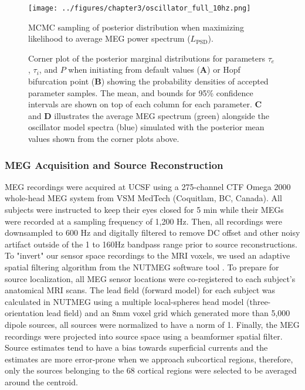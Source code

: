 \begin{figure}[ht]
    \centering
    \captionsetup{justification=centerlast}
    \texttt{[image: ../figures/chapter3/oscillator\_full\_10hz.png]}
    \caption{MCMC sampling of posterior distribution when maximizing likelihood to average MEG power spectrum ($L_{\textrm{PSD}}$).}
    \caption*{Corner plot of the posterior marginal distributions for parameters $\tau_e$, $\tau_i$, and $P$ when initiating from default values (\textbf{A}) or Hopf bifurcation point (\textbf{B}) showing the probability densities of accepted parameter samples. The mean, and bounds for 95\% confidence intervals are shown on top of each column for each parameter. \textbf{C} and \textbf{D} illustrates the average MEG spectrum (green) alongside the oscillator model spectra (blue) simulated with the posterior mean values shown from the corner plots above.}
    \label{fig:oscillator_full}
\end{figure}

\subsubsection{MEG Acquisition and Source Reconstruction}
MEG recordings were acquired at UCSF using a 275-channel CTF Omega 2000 whole-head MEG system from VSM MedTech (Coquitlam, BC, Canada). All subjects were instructed to keep their eyes closed for 5 min while their MEGs were recorded at a sampling frequency of 1,200 Hz. Then, all recordings were downsampled to 600 Hz and digitally filtered to remove DC offset and other noisy artifact outside of the 1 to 160Hz bandpass range prior to source reconstructions. To "invert" our sensor space recordings to the MRI voxels, we used an adaptive spatial filtering algorithm from the NUTMEG software tool \cite{dalal_nutmeg:_2004}. To prepare for source localization, all MEG sensor locations were co-registered to each subject's anatomical MRI scans. The lead field (forward model) for each subject was calculated in NUTMEG using a multiple local-spheres head model (three-orientation lead field) and an 8mm voxel grid which generated more than 5,000 dipole sources, all sources were normalized to have a norm of 1. Finally, the MEG recordings were projected into source space using a beamformer spatial filter. Source estimates tend to have a bias towards superficial currents and the estimates are more error-prone when we approach subcortical regions, therefore, only the sources belonging to the 68 cortical regions were selected to be averaged around the centroid.

